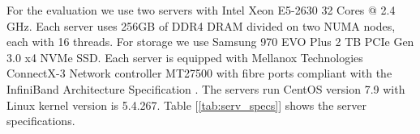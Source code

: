 For the evaluation we use two servers with Intel Xeon E5-2630 32 Cores @ 2.4
GHz. Each server uses 256GB of DDR4 DRAM divided on two NUMA nodes, each with 16
threads. For storage we use Samsung 970 EVO Plus 2 TB PCIe Gen 3.0 x4 NVMe SSD.
Each server is equipped with Mellanox Technologies ConnectX-3 Network controller
MT27500 with fibre ports compliant with the InfiniBand Architecture
Specification . The servers run CentOS version 7.9 with Linux kernel version is
5.4.267. Table [\ref{tab:serv_specs}] shows the server specifications.
\begin{table}[H]
\caption{Server specifications table.}
\label{tab:serv_specs}
\end{table}

